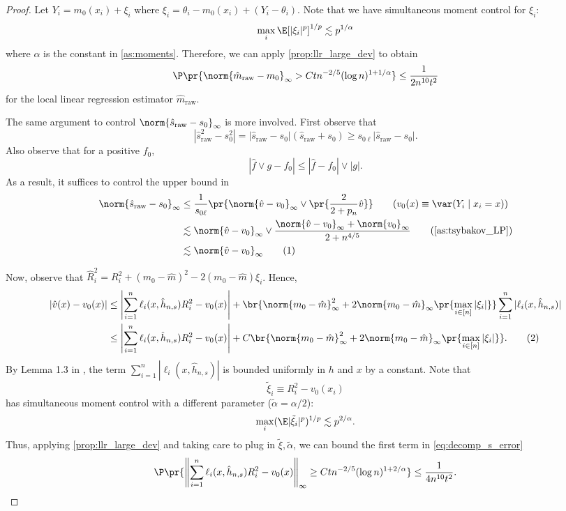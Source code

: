 \documentclass[12pt, reqno]{amsart}
\newcommand\numberthis{\addtocounter{equation}{1}\tag{\theequation}}
\newcommand{\raw}{\mathrm{raw}}
\newcommand{\absauto}[1]{\left| #1 \right|}
\newcommand{\normauto}[1]{\left\lVert #1 \right\rVert}
\newcommand{\hatm}{\hat m}
\newcommand{\hats}{\hat s}
\numberwithin{equation}{section}
\begin{document}
\begin{refsection}
\begin{appendices}
\begin{proof}
Let $Y_i = m_0(x_i) + \xi_i$ where $\xi_i = \theta_i - m_0(x_i) + (Y_i - \theta_i)$. Note
that we have simultaneous moment control for $\xi_i$: \[
\max_i \E[|\xi_i|^p]^{1/p} \lesssim p^{1/\alpha}
\]
where $\alpha$ is the constant in \cref{as:moments}. Therefore, we can apply
\cref{prop:llr_large_dev} to obtain \[
\P\pr{\norm{\hatm_\raw - m_0}_\infty > C t n^{-2/5} (\log n)^{1 + 1/\alpha}} \le \frac{1}
{2 n^{10} t^2}
\]
for the local linear regression estimator $\hatm_\raw$.

The same argument to control $\norm{\hats_\raw - s_0}_\infty$ is more involved. First
observe that \[
|\hats^2_\raw - s_0^2| = |\hats_\raw - s_0|(\hats_\raw + s_0) \ge s_{0\ell} |\hats_\raw -
s_0|.
\]
Also observe that for a positive $f_0$, \[
|\hat f \vee g - f_0| \le |\hat f - f_0| \vee |g|.
\]
As a result, it suffices to control the upper bound in \begin{align*}
\norm{\hats_\raw -
s_0}_\infty &\le \frac{1}{s_{0\ell} } \pr{\norm{\hat v - v_0}_\infty \vee \pr{\frac{2}
{2+p_n}\hat v}} \tag{$v_0(x) \equiv \var(Y_i \mid x_i=x)$}
\\
& \lesssim \norm{\hat v - v_0}_\infty \vee \frac{\norm{\hat v -
v_0}_\infty
+ \norm{v_0}_\infty}
{2+n^{4/5}} \tag{\cref{as:tsybakov_LP}}\\
& \lesssim \norm{\hat v - v_0}_\infty \numberthis \label{eq:dominate_s_with_v}
\end{align*}

Now, observe that $\hat R_i^2 = R_i^2 + (m_0 - \hatm)^2 - 2 (m_0 - \hatm) \xi_i$. Hence,
\begin{align*}
|\hat v(x) - v_0(x)| &\le \absauto{\sum_{i=1}^n \ell_i(x, \hat h_{n, s}) R_i^2 - v_0(x)} + \br{
\norm{m_0
- \hatm}_\infty^2  + 2 \norm{m_0 - \hat m}_\infty
\pr{\max_{i\in[n]} |\xi_i|}} \sum_{i=1}^n |\ell_i(x, \hat h_{n, s})| \\
& \le \absauto{\sum_{i=1}^n \ell_i(x, \hat h_{n, s}) R_i^2 - v_0(x)} + C\br{
\norm{m_0
- \hatm}_\infty^2  + 2 \norm{m_0 - \hat m}_\infty
\pr{\max_{i\in[n]} |\xi_i|}}. \numberthis
\label{eq:decomp_s_error}
\end{align*}
By Lemma 1.3 in \citet{tsybakov2008introduction}, the term $\sum_{i=1}^n |\ell_i(x, \hat h_
{n, s})|$ is bounded uniformly in $h$ and $x$ by a constant. Note that \[
\tilde \xi_i \equiv R_i^2 - v_0(x_i)
\]
has simultaneous moment control with a different parameter ($\tilde \alpha = \alpha / 2$):
\[
\max_{i} (\E|\tilde \xi_i|^p)^{1/p} \lesssim p^{2/\alpha}.
\]
Thus, applying \cref{prop:llr_large_dev} and taking care to plug in $\tilde \xi, \tilde
\alpha$, we can bound the first term in \eqref{eq:decomp_s_error} \[
\P\pr{
  \normauto{\sum_{i=1}^n \ell_i(x, \hat h_{n, s}) R_i^2 - v_0(x)}_\infty \ge C t n^{-2/5}
  (\log n)^{1 + 2/\alpha}
}\le \frac{1}{4 n^{10} t^2}.
\]


\end{proof}
\end{appendices}
\end{refsection}
\end{document}
